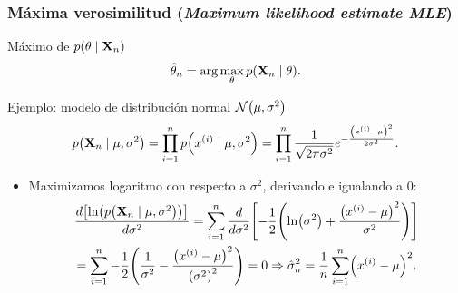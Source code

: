\documentclass[table]{beamer}
\begin{document}
\begin{frame}
    \frametitle{Máxima verosimilitud (\emph{Maximum likelihood estimate MLE})}
    \begin{block}{Máximo de $\pdf{\theta \mid \Xvec_{n}}$}
        \begin{equation*}
            \hat{\theta}_{n}
            = \arg \max_{\theta} \pdf{\Xvec_{n} \mid \theta} .
        \end{equation*}
    \end{block}
    \begin{exampleblock}{Ejemplo: modelo de distribución normal $\normal{\mu}{\sigma^{2}}$}
        \begin{equation*}
            \pdf{\Xvec_{n} \mid \mu , \sigma^{2}}
            = \prod_{i = 1}^{n} \pdf{x^{\parens{i}} \mid \mu , \sigma^{2}}
            = \prod_{i = 1}^{n} \frac{1}{\sqrt{2 \pi \sigma^{2}}} e^{- \frac{\parens{x^{\parens{i}} - \mu}^{2}}{2 \sigma^{2}}} .
        \end{equation*}
        \begin{itemize}
            \item Maximizamos logaritmo con respecto a $\sigma^{2}$, derivando e igualando a $0$:
                \begin{multline*}
                    \frac{d \sparens{\ln \parens{\pdf{\Xvec_{n} \mid \mu , \sigma^{2}}}}}{d \sigma^{2}}
                    = \sum_{i = 1}^{n} \frac{d}{d \sigma^{2}} \sparens{- \frac{1}{2} \parens{\ln \parens{\sigma^{2}} + \frac{\parens{x^{\parens{i}} - \mu}^{2}}{\sigma^{2}}}}
                    \\
                    = \sum_{i = 1}^{n} - \frac{1}{2} \parens{\frac{1}{\sigma^{2}} - \frac{\parens{x^{\parens{i}} - \mu}^{2}}{\parens{\sigma^{2}}^{2}}}
                    = 0
                    \Rightarrow \hat{\sigma}^{2}_{n} = \frac{1}{n} \sum_{i = 1}^{n} \parens{x^{\parens{i}} - \mu}^{2} .
                \end{multline*}
        \end{itemize}
    \end{exampleblock}
\end{frame}
\end{document}
